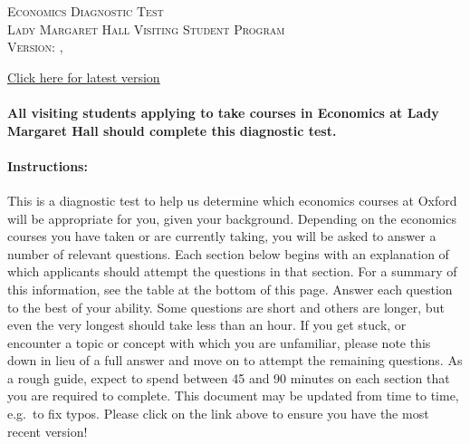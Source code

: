 \documentclass[addpoints,12pt]{exam}
\begin{document}
\begin{center}

  \textsc{\Large Economics Diagnostic Test \\ \normalsize Lady Margaret Hall Visiting Student Program \\ \vspace{0.5em} Version: \DTMtoday, \DTMcurrenttime}

  \vspace{1em}

  \href{https://raw.githubusercontent.com/fditraglia/lmh-econ-diagnostic/main/lmh-econ-diagnostic.pdf}{\underline{Click here for latest version}}

\vspace{5em}



\end{center}

\vspace{2em}

\paragraph{All visiting students applying to take courses in Economics at Lady Margaret Hall should complete this diagnostic test.}

\vspace{2em}

\paragraph{Instructions:} This is a diagnostic test to help us determine which economics courses at Oxford will be appropriate for you, given your background. Depending on the economics courses you have taken or are currently taking, you will be asked to answer a number of relevant questions. Each section below begins with an explanation of which applicants should attempt the questions in that section. For a summary of this information, see the table at the bottom of this page. Answer each question to the best of your ability. Some questions are short and others are longer, but even the very longest should take less than an hour. If you get stuck, or encounter a topic or concept with which you are unfamiliar, please note this down in lieu of a full answer and move on to attempt the remaining questions. As a rough guide, expect to spend between 45 and 90 minutes on each section that you are required to complete. This document may be updated from time to time, e.g.\ to fix typos. Please click on the link above to ensure you have the most recent version!
\end{document}
